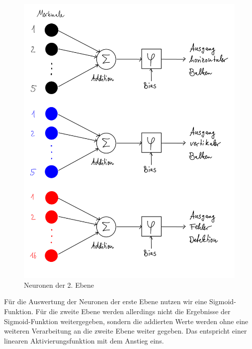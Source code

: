 \begin{figure}[hbt]
	\centering
	\includegraphics[width=0.8\linewidth]{./Bilder/Auswertung/Aufbau/page7}
	\caption{Neuronen der 2. Ebene}
	\label{Neurin2Ebene}
\end{figure}

Für die Auswertung der Neuronen der erste Ebene nutzen wir eine Sigmoid-Funktion. Für die zweite Ebene werden allerdings nicht die Ergebnisse der Sigmoid-Funktion weitergegeben, sondern die addierten Werte werden ohne eine weiteren Verarbeitung an die zweite Ebene weiter gegeben. Das entspricht einer linearen Aktivierungsfunktion mit dem Anstieg eins.

